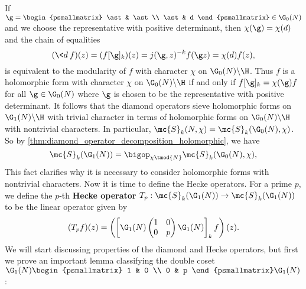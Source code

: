     If $\g = \begin{psmallmatrix} \ast & \ast \\ \ast & d \end{psmallmatrix} \in \G_{0}(N)$ and we choose the representative with positive determinant, then $\chi(\g) = \chi(d)$ and the chain of equalities
    \[
      (\<d\>f)(z) = (f[\g]_{k})(z) = j(\g,z)^{-k}f(\g z) = \chi(d)f(z),
    \]
    is equivalent to the modularity of $f$ with character $\chi$ on $\G_{0}(N)\backslash\H$. Thus $f$ is a holomorphic form with character $\chi$ on $\G_{0}(N)\backslash\H$ if and only if $f[\g]_{k} = \chi(\g)f$ for all $\g \in \G_{0}(N)$ where $\g$ is chosen to be the representative with positive determinant. It follows that the diamond operators sieve holomorphic forms on $\G_{1}(N)\backslash\H$ with trivial character in terms of holomorphic forms on $\G_{0}(N)\backslash\H$ with nontrivial characters. In particular, $\mc{S}_{k}(N,\chi) = \mc{S}_{k}(\G_{0}(N),\chi)$. So by \cref{thm:diamond_operator_decomposition_holomorphic}, we have
    \[
      \mc{S}_{k}(\G_{1}(N)) = \bigop_{\chi \tmod{N}}\mc{S}_{k}(\G_{0}(N),\chi),
    \]
    This fact clarifies why it is necessary to consider holomorphic forms with nontrivial characters. Now it is time to define the Hecke operators. For a prime $p$, we define the $p$-th \textbf{Hecke operator} $T_{p}:\mc{S}_{k}(\G_{1}(N)) \to \mc{S}_{k}(\G_{1}(N))$ to be the linear operator given by
    \[
      (T_{p}f)(z) = \left(\left[\G_{1}(N)\begin{pmatrix} 1 & 0 \\ 0 & p \end{pmatrix}\G_{1}(N)\right]_{k}f\right)(z).
    \]
    We will start discussing properties of the diamond and Hecke operators, but first we prove an important lemma classifying the double coset $\G_{1}(N)\begin{psmallmatrix} 1 & 0 \\ 0 & p \end{psmallmatrix}\G_{1}(N)$:

